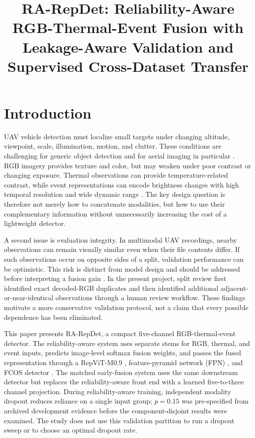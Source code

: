 \documentclass[pdflatex,sn-basic,Numbered,iicol]{sn-jnl}
\title[RA-RepDet for tri-modal UAV detection]{RA-RepDet: Reliability-Aware RGB-Thermal-Event Fusion with Leakage-Aware Validation and Supervised Cross-Dataset Transfer}
\author[1]{\fnm{Nan} \sur{Xin}}
\author*[1]{\fnm{Xueting} \sur{Jin}}\email{jinxueting@ahpc.edu.cn}
\affil*[1]{\orgname{Anhui Police College}, \orgaddress{\city{Hefei}, \state{Anhui}, \country{China}}}
\begin{document}
\raggedbottom
\maketitle

\section{Introduction}
UAV vehicle detection must localize small targets under changing altitude, viewpoint, scale, illumination, motion, and clutter. These conditions are challenging for generic object detection and for aerial imaging in particular \cite{zhao2019object,cheng2016survey,xia2022dota,zhu2017deepRS}. RGB imagery provides texture and color, but may weaken under poor contrast or changing exposure. Thermal observations can provide temperature-related contrast, while event representations can encode brightness changes with high temporal resolution and wide dynamic range \cite{baltrusaitis2019multimodal,gallego2022event}. The key design question is therefore not merely how to concatenate modalities, but how to use their complementary information without unnecessarily increasing the cost of a lightweight detector.

A second issue is evaluation integrity. In multimodal UAV recordings, nearby observations can remain visually similar even when their file contents differ. If such observations occur on opposite sides of a split, validation performance can be optimistic. This risk is distinct from model design and should be addressed before interpreting a fusion gain \cite{kapoor2023leakage,cawley2010overfitting}. In the present project, split review first identified exact decoded-RGB duplicates and then identified additional adjacent-or-near-identical observations through a human review workflow. These findings motivate a more conservative validation protocol, not a claim that every possible dependence has been eliminated.

This paper presents RA-RepDet, a compact five-channel RGB-thermal-event detector. The reliability-aware system uses separate stems for RGB, thermal, and event inputs, predicts image-level softmax fusion weights, and passes the fused representation through a RepViT-M0.9 \cite{wang2024repvit}, feature-pyramid network (FPN) \cite{lin2017fpn}, and FCOS detector \cite{tian2019fcos}. The matched early-fusion system uses the same downstream detector but replaces the reliability-aware front end with a learned five-to-three channel projection. During reliability-aware training, independent modality dropout reduces reliance on a single input group; $p=0.15$ was pre-specified from archived development evidence before the component-disjoint results were examined. The study does not use this validation partition to run a dropout sweep or to choose an optimal dropout rate.
\end{document}
